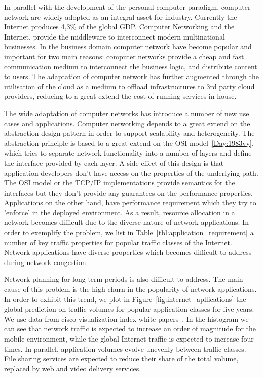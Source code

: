 In parallel with the development of the personal computer paradigm, computer
network are widely adopted as an integral asset for industry.  Currently the
Internet produces 4,3\% of the global GDP. Computer Networking and the Internet,
provide the middleware to interconnect modern multinational businesses. In the
business domain computer network have become popular and important for two main
reasons: computer networks provide a cheap and fast communication medium
to interconnect the business logic, and distribute
content to users. The adaptation of computer network has further augmented
through the utilisation of the cloud as a medium to offload infrastructures to
3rd party cloud providers, reducing to a great extend the cost of running
services in house.

The wide adaptation of computer networks has introduce a number of new use cases
and applications. Computer networking depends to a great extend on the
abstraction design pattern in order to support scalability and heterogeneity.
The abstraction principle is based to a great extend on the OSI
model~\ref{Day:1983vy}, which tries to separate network functionality into a
number of layers and define the interface provided by each layer. A side effect
of this design is that application developers don't have access on the
properties of the underlying path.  The OSI model or
the TCP/IP implementations provide semantics for the interfaces but they don't
provide any guarantees on the performance properties.  Applications on the other
hand, have performance requirement which they try to 'enforce' in the deployed
environment. As a result, resource allocation in a network becomes difficult due
to the diverse nature of network applications. In order to exemplify the problem, 
we list in Table~\ref{tbl:application_requirement} a number of key traffic properties 
for popular traffic classes of the Internet. Network applications have
diverse properties which becomes difficult to address during network congestion. 

Network planning for long term periods is also difficult to address.  The main
cause of this problem is the high churn in the  popularity of network
applications.  In order to exhibit this trend, we plot in
Figure~\ref{fig:internet_apllications} the global prediction on traffic volumes
for popular application classes for five years. We use data from cisco
visualization index white papers~\cite{Mobile:2012vd,Cisco:2012wu}. In the
histogram we can see that network traffic is expected to increase an order of
magnitude for the mobile environment, while the global Internet traffic is
expected to increase four times. In parallel, application volumes evolve
unevenly between traffic classes. File sharing services are expected to reduce
their share of the total volume, replaced by web and video delivery services. 


